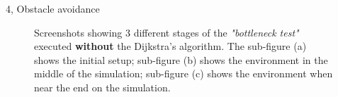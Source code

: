 \documentclass[10pt,a4paper]{article}
\begin{document}
\begin{task}{4, Obstacle avoidance}
\begin{figure}[H]
    \centering
    \hfill
    \hfill
    \caption{Screenshots showing 3 different stages of the \textit{"bottleneck test"} executed \textbf{without} the Dijkstra's algorithm. The sub-figure (a) shows the initial setup; sub-figure (b) shows the environment in the middle of the simulation; sub-figure (c) shows the environment when near the end on the simulation.}
    \label{fig:bottleneck-no-dijkstra}
\end{figure}


\end{task}
\end{document}
